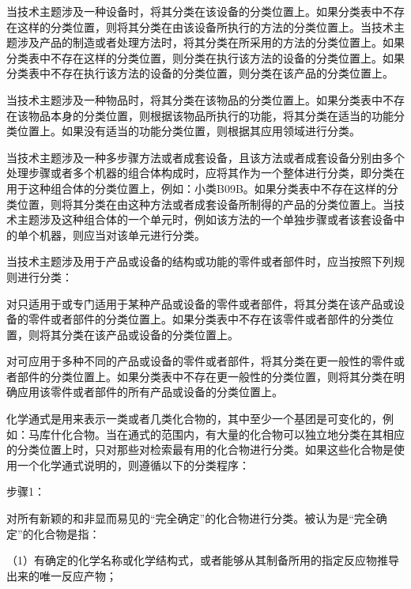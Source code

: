 当技术主题涉及一种设备时，将其分类在该设备的分类位置上。如果分类表中不存在这样的分类位置，则将其分类在由该设备所执行的方法的分类位置上。当技术主题涉及产品的制造或者处理方法时，将其分类在所采用的方法的分类位置上。如果分类表中不存在这样的分类位置，则分类在执行该方法的设备的分类位置上。如果分类表中不存在执行该方法的设备的分类位置，则分类在该产品的分类位置上。

当技术主题涉及一种物品时，将其分类在该物品的分类位置上。如果分类表中不存在该物品本身的分类位置，则根据该物品所执行的功能，将其分类在适当的功能分类位置上。如果没有适当的功能分类位置，则根据其应用领域进行分类。

当技术主题涉及一种多步骤方法或者成套设备，且该方法或者成套设备分别由多个处理步骤或者多个机器的组合体构成时，应将其作为一个整体进行分类，即分类在用于这种组合体的分类位置上，例如：小类B09B。如果分类表中不存在这样的分类位置，则将其分类在由这种方法或者成套设备所制得的产品的分类位置上。当技术主题涉及这种组合体的一个单元时，例如该方法的一个单独步骤或者该套设备中的单个机器，则应当对该单元进行分类。

当技术主题涉及用于产品或设备的结构或功能的零件或者部件时，应当按照下列规则进行分类：

对只适用于或专门适用于某种产品或设备的零件或者部件，将其分类在该产品或设备的零件或者部件的分类位置上。如果分类表中不存在该零件或者部件的分类位置，则将其分类在该产品或设备的分类位置上。

对可应用于多种不同的产品或设备的零件或者部件，将其分类在更一般性的零件或者部件的分类位置上。如果分类表中不存在更一般性的分类位置，则将其分类在明确应用该零件或者部件的所有产品或设备的分类位置上。

化学通式是用来表示一类或者几类化合物的，其中至少一个基团是可变化的，例如：马库什化合物。当在通式的范围内，有大量的化合物可以独立地分类在其相应的分类位置上时，只对那些对检索最有用的化合物进行分类。如果这些化合物是使用一个化学通式说明的，则遵循以下的分类程序：

{\kaiti 步骤1：}

对所有新颖的和非显而易见的“完全确定”的化合物进行分类。被认为是“完全确定”的化合物是指：

{\setlength{\parindent}{17.1bp}（1）有确定的化学名称或化学结构式，或者能够从其制备所用的指定反应物推导出来的唯一反应产物；\par}

